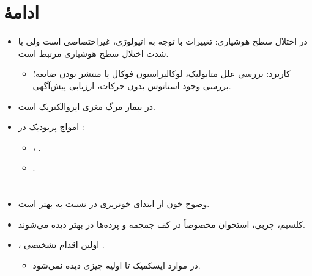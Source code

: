 \documentclass[a4paper,12pt]{extbook}
\begin{document}
\section*{ادامهٔ }
\begin{itemize}
\item {} در اختلال سطح هوشیاری: تغییرات  با توجه به اتیولوژی، غیراختصاصی است ولی با شدت اختلال سطح هوشیاری مرتبط است.
  \begin{itemize}
  \item کاربرد: بررسی علل متابولیک، لوکالیزاسیون فوکال یا منتشر بودن ضایعه؛ بررسی وجود استاتوس بدون حرکات، ارزیابی پیش‌آگهی.
  \end{itemize}
\item {} در بیمار مرگ مغزی ایزوالکتریک است.
\item امواج پریودیک در :
  \begin{itemize}
  \item {}، .
  \item {}.
  \end{itemize}
\end{itemize}

\section*{}
\begin{itemize}
\item وضوح خون از ابتدای خونریزی در  نسبت به  بهتر است.
\item کلسیم، چربی، استخوان مخصوصاً در کف جمجمه و پرده‌ها در  بهتر دیده می‌شوند.
\item {}، اولین اقدام تشخیصی .
  \begin{itemize}
  \item در موارد ایسکمیک تا  اولیه چیزی دیده نمی‌شود.
  \end{itemize}
\end{itemize}
\end{document}
